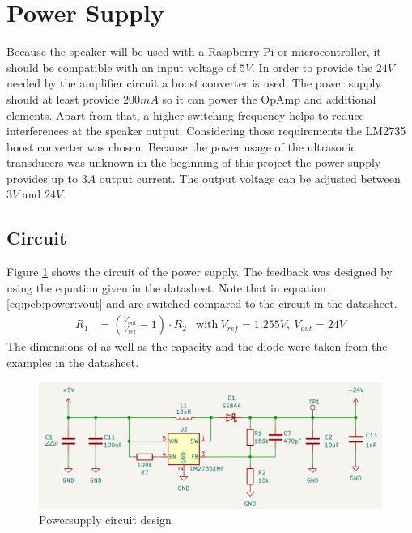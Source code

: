 \section{Power Supply}


Because the speaker will be used with a Raspberry Pi or microcontroller, it should be compatible with an input voltage of $5V$. In order to provide the $24V$ needed by the amplifier circuit a boost converter is used.\p
The power supply should at least provide $200mA$ so it can power the OpAmp and additional elements. Apart from that, a higher switching frequency helps to reduce interferences at the speaker output.\p
%
Considering those requirements the LM2735 boost converter was chosen. Because the power usage of the ultrasonic transducers was unknown in the beginning of this project the power supply provides up to $3A$ output current. The output voltage can be adjusted between $3V$ and $24V$.\cite{texas_instruments_lm2735-q1_2018}

\subsection{Circuit}

Figure \ref{fig:pcb:power_circuit} shows the circuit of the power supply. The feedback was designed by using the equation given in the datasheet.
Note that in equation \ref{eq:pcb:power:vout}  and  are switched compared to the circuit in the datasheet.
%
\begin{align}
  R_1 &= \left(\frac{V_{out}}{V_{ref}} - 1\right) \cdot R_2\label{eq:pcb:power:vout}
  &\mathrm{with~} V_{ref} = 1.255V,~V_{out} = 24V
\end{align}
%
The dimensions of  as well as the capacity  and the diode  were taken from the examples in the datasheet.
%
\begin{figure}[ht]
  \centering
  \includegraphics[width=\textwidth]{src/assets/pictures/circuit/powersupply_circuit.png}
  \caption{Powersupply circuit design}\label{fig:pcb:power_circuit}
\end{figure}